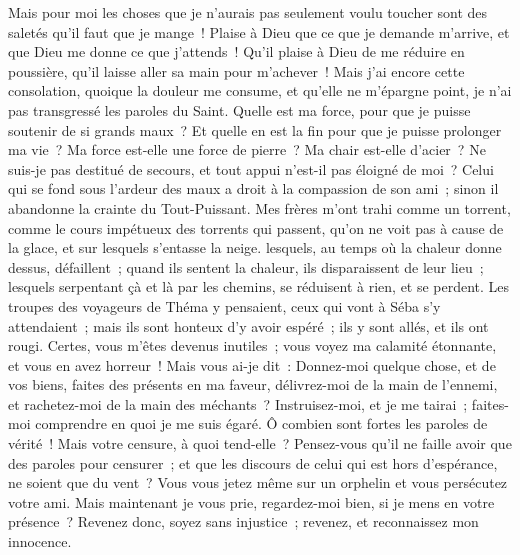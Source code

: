 \begin{multicols}{2}
Mais pour moi les choses que je n'aurais pas seulement voulu toucher sont des saletés qu'il faut que je mange~!
Plaise à Dieu que ce que je demande m'arrive, et que Dieu me donne ce que j'attends~!
Qu'il plaise à Dieu de me réduire en poussière, qu'il laisse aller sa main pour m'achever~!
Mais j'ai encore cette consolation, quoique la douleur me consume, et qu'elle ne m'épargne point, je n'ai pas transgressé les paroles du Saint.
Quelle est ma force, pour que je puisse soutenir de si grands maux~? Et quelle en est la fin pour que je puisse prolonger ma vie~?
Ma force est-elle une force de pierre~? Ma chair est-elle d'acier~?
Ne suis-je pas destitué de secours, et tout appui n'est-il pas éloigné de moi~?
Celui qui se fond sous l'ardeur des maux a droit à la compassion de son ami~; sinon il abandonne la crainte du Tout-Puissant.
Mes frères m'ont trahi comme un torrent, comme le cours impétueux des torrents qui passent,
qu'on ne voit pas à cause de la glace, et sur lesquels s'entasse la neige.
lesquels, au temps où la chaleur donne dessus, défaillent~; quand ils sentent la chaleur, ils disparaissent de leur lieu~;
lesquels serpentant çà et là par les chemins, se réduisent à rien, et se perdent.
Les troupes des voyageurs de Théma y pensaient, ceux qui vont à Séba s'y attendaient~;
mais ils sont honteux d'y avoir espéré~; ils y sont allés, et ils ont rougi.
Certes, vous m'êtes devenus inutiles~; vous voyez ma calamité étonnante, et vous en avez horreur~!
Mais vous ai-je dit~: Donnez-moi quelque chose, et de vos biens, faites des présents en ma faveur,
délivrez-moi de la main de l'ennemi, et rachetez-moi de la main des méchants~?
Instruisez-moi, et je me tairai~; faites-moi comprendre en quoi je me suis égaré.
Ô combien sont fortes les paroles de vérité~! Mais votre censure, à quoi tend-elle~?
Pensez-vous qu'il ne faille avoir que des paroles pour censurer~; et que les discours de celui qui est hors d'espérance, ne soient que du vent~?
Vous vous jetez même sur un orphelin et vous persécutez votre ami.
Mais maintenant je vous prie, regardez-moi bien, si je mens en votre présence~?
Revenez donc, soyez sans injustice~; revenez, et reconnaissez mon innocence.

\end{multicols}
